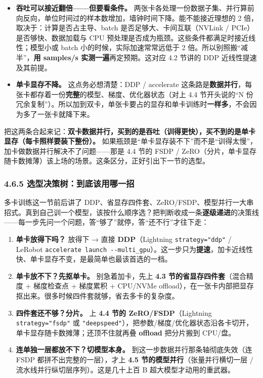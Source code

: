 \documentclass[
  chinese,
]{ctexart}
\providecommand{\tightlist}{%
  \setlength{\itemsep}{0pt}\setlength{\parskip}{0pt}}
\begin{document}
\begin{itemize}
\tightlist
\item
  \textbf{吞吐可以接近翻倍------但要看条件。}
  两张卡各处理一份数据子集、并行算前向反向，单位时间过的样本数增加，墙钟时间下降。能不能接近理想的
  2 倍，取决于：计算是否占主导、batch 是否足够大、卡间互联（NVLink /
  PCIe）是否够快、数据加载与 CPU
  预处理是否成为瓶颈。这些条件都满足时接近线性；模型小或 batch
  小的时候，实际加速常常远低于 2 倍。所以别照搬``减半''，\textbf{用
  samples/s 实测一遍}再定预期。这对应 4.2 节讲的 DDP
  近线性提速及其前提。
\item
  \textbf{单卡显存不降。} 这点务必想清楚：DDP / accelerate
  这条路是\textbf{数据并行}，每张卡都存着一份\textbf{完整}的模型、梯度、优化器状态（对上
  4.4 节开头说的``N
  份冗余复制''）。所以加到双卡，单张卡要占的显存和单卡训练时\textbf{一样多}，不会因为多了一张卡就降下来。
\end{itemize}

把这两条合起来记：\textbf{双卡数据并行，买到的是吞吐（训得更快），买不到的是单卡显存（每卡照样要装下整份）。}
如果瓶颈是``单卡显存装不下''而不是``训得太慢''，加卡做数据并行解决不了问题------那是
4.4 节的 FSDP /
ZeRO（分片，单卡显存随卡数摊薄）该上场的场景。这条区分，正好引出下一节的选型。

\subsubsection{4.6.5
选型决策树：到底该用哪一招}\label{ux9009ux578bux51b3ux7b56ux6811ux5230ux5e95ux8be5ux7528ux54eaux4e00ux62db}

多卡训练这一节前后讲了
DDP、省显存四件套、ZeRO/FSDP、模型并行一大串招式。真到自己训一个模型，该按什么顺序选？把判断收成一条\textbf{逐级递进}的决策线------每一步先问一个问题，答``够了''就停，答``还不行''才往下走：

\begin{enumerate}
\def\labelenumi{\arabic{enumi}.}
\tightlist
\item
  \textbf{单卡放得下吗？} 放得下 → 直接 \textbf{DDP}（Lightning
  \texttt{strategy="ddp"} / LeRobot
  \texttt{accelerate\ launch\ -\/-multi\_gpu}）。这一步只为\textbf{提速}，加卡近线性快、单卡显存不变，是最简单也最该首选的一档。
\item
  \textbf{单卡放不下？先抠单卡。} 别急着加卡，先上 \textbf{4.3
  节的省显存四件套}（混合精度 + 梯度检查点 + 梯度累积 + CPU/NVMe
  offload），在一张卡内部把显存抠出来。很多时候四件套就够，省去多卡的复杂度。
\item
  \textbf{四件套还不够？分片。} 上 \textbf{4.4 节的
  ZeRO/FSDP}（Lightning \texttt{strategy="fsdp"} 或
  \texttt{"deepspeed"}），把参数/梯度/优化器状态沿各卡切开，单卡显存随卡数摊薄；还顶不住就再叠
  \textbf{offload} 把分片搬到 CPU/盘。
\item
  \textbf{连单独一层都放不下？切模型本身。}
  到这一步数据并行那条轴彻底失效（连 FSDP 都拼不出完整的一层），才上
  \textbf{4.5 节的模型并行}（张量并行横切一层 /
  流水线并行纵切层序列）。这是几十上百 B 超大模型才动用的重武器。
\end{enumerate}
\end{document}
